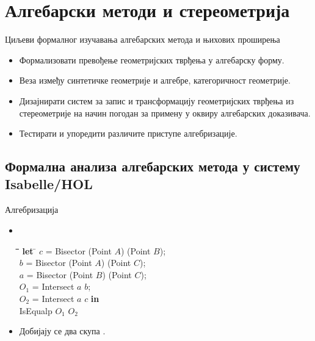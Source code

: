 \documentclass[slidestop, compress, mathserif, containsverbatim, xcolor=dvipsnames]{beamer}
\begin{document}
\section{Алгебарски методи и стереометрија}

\begin{frame}{Циљеви формалног изучавања алгебарских метода и њихових проширења}
  \begin{itemize}
  \item Формализовати превођење геометријских тврђења у алгебарску
    форму. \vfill
  \item Веза између синтетичке геометрије и алгебре, категоричност
    геометрије. \vfill
  \item Дизајнирати систем за запис и трансформацију геометријских
    тврђења из стереометрије на начин погодан за примену у оквиру
    алгебарских доказивача. \vfill
  \item Тестирати и упоредити различите приступе алгебризације.
  \end{itemize}
\end{frame}

\subsection*{Формална анализа алгебарских метода у систему Isabelle/HOL}

\begin{frame}{Алгебризација}
  \begin{itemize}
  \item \begin{footnotesize} {\tt
    \begin{tabbing}
      \hspace{5mm}\=\hspace{5mm}\=\hspace{5mm}\=\hspace{5mm}\=\hspace{5mm}\=\kill
      \textbf{let} \= $c$ = Bisector (Point $A$) (Point $B$); \\
      \> $b$ = Bisector (Point $A$) (Point $C$); \\
      \> $a$ = Bisector (Point $B$) (Point $C$); \\
      \> $O_1$ = Intersect $a$ $b$; \\
      \> $O_2$ = Intersect $a$ $c$ \textbf{in} \\
      \> IsEqualp $O_1$ $O_2$
    \end{tabbing}
  } \end{footnotesize} \vfill
  \item Добијају се два скупа . \vfill
  \end{itemize}
\end{frame}
\end{document}
